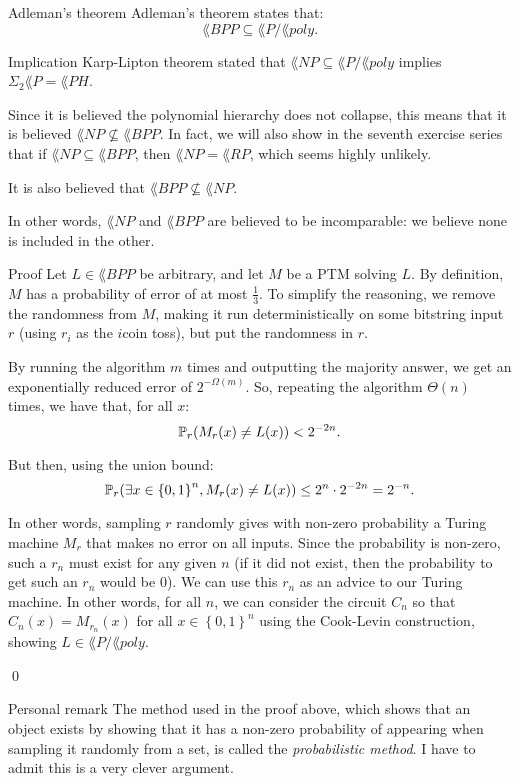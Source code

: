 \documentclass[a4paper]{article}
\begin{document}
\begin{parag}{Adleman's theorem}
    Adleman's theorem states that: 
    \[\lang{BPP} \subseteq \lang{P} / \lang{poly}.\]

    \begin{subparag}{Implication}
        Karp-Lipton theorem stated that $\lang{NP} \subseteq \lang{P} / \lang{poly}$ implies $\Sigma_2 \lang{P} = \lang{PH}$.

        Since it is believed the polynomial hierarchy does not collapse, this means that it is believed $\lang{NP} \not\subseteq \lang{BPP}$. In fact, we will also show in the seventh exercise series that if $\lang{NP} \subseteq \lang{BPP}$, then $\lang{NP} = \lang{RP}$, which seems highly unlikely.

        It is also believed that $\lang{BPP} \not\subseteq \lang{NP}$.

        In other words, $\lang{NP}$ and $\lang{BPP}$ are believed to be incomparable: we believe none is included in the other.
    \end{subparag}

    \begin{subparag}{Proof}
        Let $L \in \lang{BPP}$ be arbitrary, and let $M$ be a PTM solving $L$. By definition, $M$ has a probability of error of at most $\frac{1}{3}$. To simplify the reasoning, we remove the randomness from $M$, making it run deterministically on some bitstring input $r$ (using $r_i$ as the $i$\Th coin toss), but put the randomness in $r$.

        By running the algorithm $m$ times and outputting the majority answer, we get an exponentially reduced error of $2^{- \Omega\left(m\right)}$. So, repeating the algorithm $\Theta\left(n\right)$ times, we have that, for all $x$: 
        \[\prob_r\left(M_r\left(x\right) \neq L\left(x\right)\right) < 2^{- 2n}.\]

        But then, using the union bound: 
        \[\prob_r\left(\exists x \in \left\{0, 1\right\}^n, M_r\left(x\right) \neq L\left(x\right)\right) \leq 2^n \cdot 2^{-2n} = 2^{-n}.\]

        In other words, sampling $r$ randomly gives with non-zero probability a Turing machine $M_r$ that makes no error on all inputs. Since the probability is non-zero, such a $r_n$ must exist for any given $n$ (if it did not exist, then the probability to get such an $r_n$ would be 0). We can use this $r_n$ as an advice to our Turing machine. In other words, for all $n$, we can consider the circuit $C_n$ so that $C_n\left(x\right) = M_{r_n}\left(x\right)$ for all $x \in \left\{0, 1\right\}^n$ using the Cook-Levin construction, showing $L \in \lang{P} / \lang{poly}$.

        \qed
    \end{subparag}

    \begin{subparag}{Personal remark}
        The method used in the proof above, which shows that an object exists by showing that it has a non-zero probability of appearing when sampling it randomly from a set, is called the \textit{probabilistic method}. I have to admit this is a very clever argument.
    \end{subparag}
\end{parag}
\end{document}
